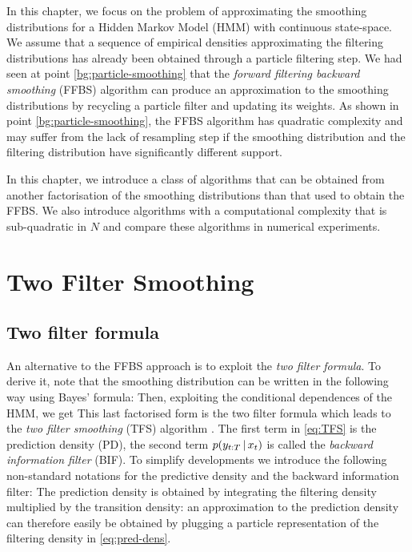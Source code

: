 
In this chapter, we focus on the problem of approximating the smoothing distributions for a Hidden Markov Model (HMM) with continuous state-space.
We assume that a sequence of empirical densities approximating the filtering distributions has already been obtained through a particle filtering step.
We had seen at point \ref{bg:particle-smoothing} that the \emph{forward filtering backward smoothing} (FFBS) algorithm can produce an approximation to the smoothing distributions by recycling a particle filter and updating its weights.  As shown in point \ref{bg:particle-smoothing}, the FFBS algorithm has quadratic complexity and may suffer from the lack of resampling step if the smoothing distribution and the filtering distribution have significantly different support. 

In this chapter, we introduce a class of algorithms that can be obtained from another factorisation of the smoothing distributions than that used to obtain the FFBS. We also introduce algorithms with a computational complexity that is sub-quadratic in $N$ and compare these algorithms in numerical experiments.

\section{\label{sec:TFS}Two Filter Smoothing}


\subsection{\label{point:TFS}Two filter formula}
An alternative to the FFBS approach is to exploit the \emph{two filter formula}. 
To derive it, note that the smoothing distribution can be written in the following way using Bayes' formula:
%
% 
Then, exploiting the conditional dependences of the HMM, we get
%
%
This last factorised form is the two filter formula which leads to the \emph{two filter smoothing} (TFS) algorithm \citep{bresler86, kitagawa96}. 
The first term in \eqref{eq:TFS} is the prediction density (PD), 
the second term $p(y_{t:T}\,|\, x_{t})$ is called the \emph{backward information filter} (BIF). To simplify developments we introduce the following non-standard notations for the predictive density and the backward information filter:
%
%
The prediction density is obtained by integrating the filtering density multiplied by the transition density:
%
%
an approximation to the prediction density can therefore easily be obtained by plugging a particle representation of the filtering density in \eqref{eq:pred-dens}. 
